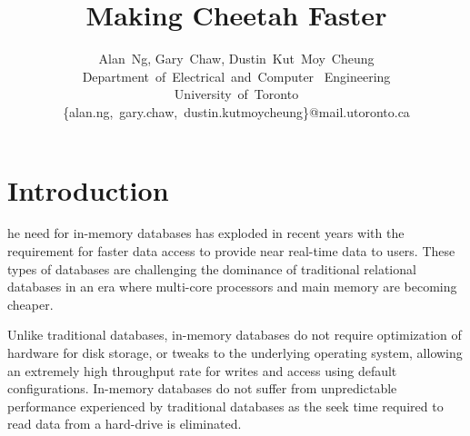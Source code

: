 \documentclass[11pt,journal,compsoc]{IEEEtran}
\begin{document}
%
\title{Making Cheetah Faster}

\author{Alan~Ng,
        Gary~Chaw,
        Dustin~Kut~Moy~Cheung\vspace{5 mm}\\Department~of~Electrical~and~Computer~
    Engineering\\University~of~Toronto\\\{alan.ng,~gary.chaw,~dustin.kutmoycheung\}@mail.utoronto.ca}

\maketitle

\IEEEdisplaynotcompsoctitleabstractindextext

\IEEEpeerreviewmaketitle

\section{Introduction}
he need for in-memory databases has exploded in recent years with the
requirement for faster data access to provide near real-time data to users.
These types of databases are challenging the dominance of traditional relational
databases in an era where multi-core processors and main memory are becoming
cheaper.


Unlike traditional databases, in-memory databases do not require optimization of
hardware for disk storage, or tweaks to the underlying operating system,
allowing an extremely high throughput rate for writes and access using default
configurations. In-memory databases do not suffer from unpredictable performance
experienced by traditional databases as the seek time required to read data from
a hard-drive is eliminated.
\end{document}
